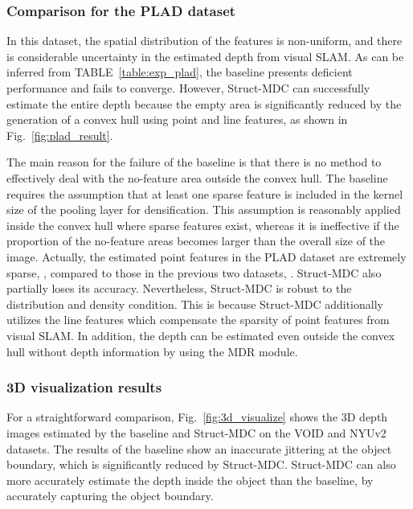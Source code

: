 \subsubsection{Comparison for the PLAD dataset}
In this dataset, the spatial distribution of the features is non-uniform, and there is \textcolor{color1}{considerable} uncertainty in the estimated depth from visual SLAM. 
As \textcolor{color1}{can be inferred from} TABLE~\ref{table:exp_plad}, the baseline \textcolor{color1}{presents} deficient performance and fail\textcolor{color1}{s} to converge. \textcolor{color1}{However}, Struct-MDC \textcolor{color1}{can} successfully estimate the entire depth \textcolor{color1}{because} the empty area \textcolor{color1}{is} significantly reduced by \textcolor{color1}{the generation of}  a convex hull using point and line features, as shown in  Fig.~\ref{fig:plad_result}. 

The main reason \textcolor{color1}{for the failure of} the baseline is that there is no \textcolor{color1}{method} to effectively \textcolor{color1}{deal with} the no-feature area outside the convex hull. The baseline requires the assumption that at least one sparse feature \textcolor{color1}{is} included in the kernel size of the pooling layer for \textcolor{color1}{densification}. This assumption is reasonably applied inside the convex hull where sparse features exist, \textcolor{color1}{whereas} it is \textcolor{color1}{in}effective if the proportion of the no-feature areas becomes large\textcolor{color1}{r than} the overall size of the image. Actually, the estimated point features \textcolor{color1}{in the} PLAD \textcolor{color1}{dataset} are extremely sparse, , compared to \textcolor{color1}{those in} the previous two datasets, . 
Struct-MDC also \textcolor{color1}{partially loses its} accuracy. Nevertheless, Struct-MDC is robust to the distribution and density condition.
This is because Struct-MDC additionally utilizes the line features which compensate the sparsity of point features from visual SLAM.  
In addition, the depth can be estimated even outside the convex hull without depth information by using the MDR module. 



\subsubsection{3D visualization results}
For a straightforward comparison, Fig.~\ref{fig:3d_visualize} \textcolor{color1}{shows} the 3D depth images estimated by the baseline and Struct-MDC \textcolor{color1}{on the} VOID and NYUv2 \textcolor{color1}{datasets}. 
The \textcolor{color1}{results of} the baseline \textcolor{color1}{show an} inaccurate jittering at the object boundary, \textcolor{color1}{which} is significantly reduced \textcolor{color1}{by} Struct-MDC. 
Struct-MDC can also more accurately estimate the depth inside the object than the baseline, by accurately \textcolor{color1}{capturing} the object boundary. 


